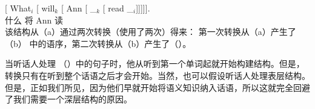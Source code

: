 %
\ea
\gll {}[ What$_i$ [ will$_k$ [ Ann [ \_$_k$ [ read \_$_i$]]]]].\\
{}\spacebr{}{} 什么 \spacebr{} 将 \spacebr{} Ann \spacebr{} {} \spacebr{}{} 读\\
\z
该结构从（a）通过两次转换（使用了两次\moveac）得来：
\eal
{}
\zl
第一次转换从（a）产生了（b） 中的语序，第二次转换从（b）产生了（）。

当听话人处理 （）中的句子时，他从听到第一个单词起就开始构建结构。但是，转换只有在听到整个话语之后才会开始。当然，也可以假设听话人处理表层结构。但是，正如我们所见，因为他们早就开始将语义知识纳入话语，所以这就完全回避了我们需要一个深层结构的原因。

